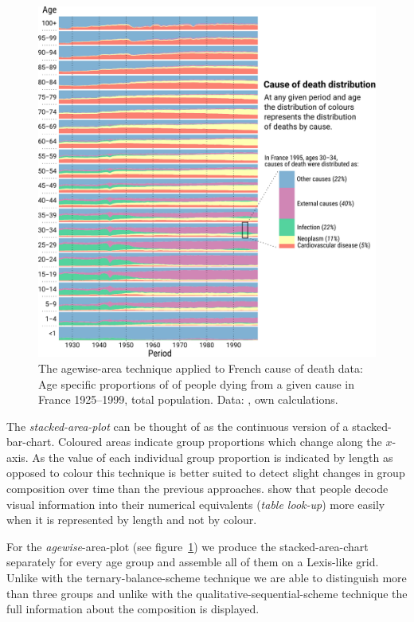 \documentclass[parskip=half]{scrartcl}
\begin{document}
\begin{figure}[!htb]
  \centering
  \includegraphics[width = \textwidth]{./fig/agewise_area.pdf}
  \caption{The agewise-area technique applied to French cause of death data: Age specific proportions of of people dying from a given cause in France 1925--1999, total population. Data: \cite{Vallin2014}, own calculations.}
  \label{fig:aag}
\end{figure}

The \emph{stacked-area-plot} can be thought of as the continuous version of a stacked-bar-chart. Coloured areas indicate group proportions which change along the $x$-axis. As the value of each individual group proportion is indicated by length as opposed to colour this technique is better suited to detect slight changes in group composition over time than the previous approaches. \textcite{Cleveland1984} show that people decode visual information into their numerical equivalents (\emph{table look-up}) more easily when it is represented by length and not by colour.

For the \emph{agewise}-area-plot (see figure~\ref{fig:aag}) we produce the stacked-area-chart separately for every age group and assemble all of them on a Lexis-like grid. Unlike with the ternary-balance-scheme technique we are able to distinguish more than three groups and unlike with the qualitative-sequential-scheme technique the full information about the composition is displayed.
\end{document}
